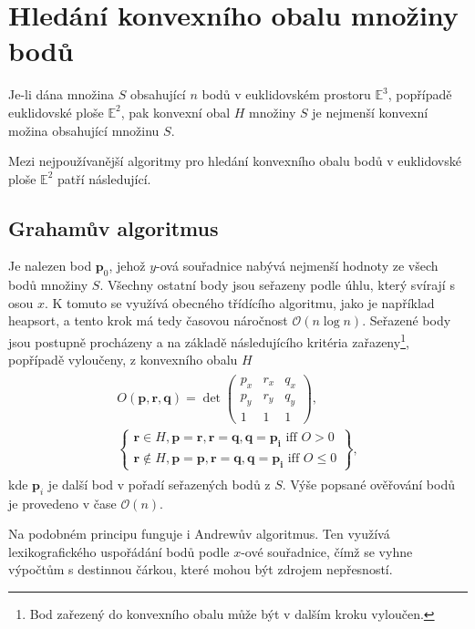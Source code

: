 \documentclass[twoside]{ctuthesis}
\begin{document}
\section{Hledání konvexního obalu množiny bodů}
Je-li dána množina $S$ obsahující $n$ bodů v euklidovském prostoru $\mathbb{E}^3$, popřípadě euklidovské ploše $\mathbb{E}^2$, pak konvexní obal $H$ množiny $S$ je nejmenší konvexní možina obsahující množinu $S$.\cite{chan1996optimal}

Mezi nejpoužívanější algoritmy pro hledání konvexního obalu bodů v  euklidovské ploše $\mathbb{E}^2$ patří následující.
\subsection{Grahamův algoritmus}
Je nalezen bod $\mathbf{p}_0$, jehož $y$-ová souřadnice nabývá nejmenší hodnoty ze všech bodů množiny $S$. Všechny ostatní body jsou seřazeny podle úhlu, který svírají s osou $x$. K tomuto se využívá obecného třídícího algoritmu, jako je například heapsort, a tento krok má tedy časovou náročnost $\mathcal{O}(n\log n)$. Seřazené body jsou postupně procházeny a na základě následujícího kritéria zařazeny\footnote{Bod zařezený do konvexního obalu může být v dalším kroku vyloučen.}, popřípadě vyloučeny, z konvexního obalu $H$ 
        \begin{align}
            \begin{gathered}
            O(\mathbf{p}, \mathbf{r}, \mathbf{q}) = \det \begin{pmatrix} p_x & r_x & q_x \\ p_y & r_y & q_y \\ 1 & 1 & 1 \end{pmatrix}, \\
            \left\{ \begin{gathered}
                    \mathbf{r} \in H, \mathbf{p} = \mathbf{r}, \mathbf{r} = \mathbf{q}, \mathbf{q}  = \mathbf{p_i} \text{ iff } O > 0 \\
                    \mathbf{r} \notin H, \mathbf{p} = \mathbf{p}, \mathbf{r} = \mathbf{q}, \mathbf{q}  = \mathbf{p_i} \text{ iff } O \leq 0
            \end{gathered} \right\},
        \end{gathered}
        \end{align}
kde $\mathbf{p}_i$ je další bod v pořadí seřazených bodů z $S$. Výše popsané ověřování bodů je provedeno v čase $\mathcal{O}(n)$.\cite{convex_hull_formalizing}


Na podobném principu funguje i Andrewův algoritmus. Ten využívá lexikografického uspořádání bodů podle $x$-ové souřadnice, čímž se vyhne výpočtům s destinnou čárkou, které mohou být zdrojem nepřesností.\cite{convex_hull_review}
\end{document}
